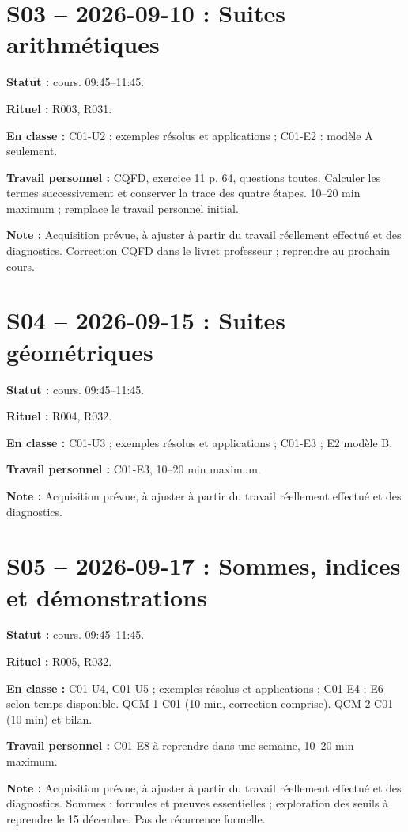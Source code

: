 \section*{S03 -- 2026-09-10 : Suites arithmétiques}
\textbf{Statut :} cours. 09:45–11:45.\par\textbf{Rituel :} R003, R031.\par\textbf{En classe :} C01-U2 ; exemples résolus et applications ; C01-E2 : modèle A seulement. \par\textbf{Travail personnel :} CQFD, exercice 11 p. 64, questions toutes. Calculer les termes successivement et conserver la trace des quatre étapes. 10–20 min maximum ; remplace le travail personnel initial.\par\textbf{Note :} Acquisition prévue, à ajuster à partir du travail réellement effectué et des diagnostics. Correction CQFD dans le livret professeur ; reprendre au prochain cours.
\section*{S04 -- 2026-09-15 : Suites géométriques}
\textbf{Statut :} cours. 09:45–11:45.\par\textbf{Rituel :} R004, R032.\par\textbf{En classe :} C01-U3 ; exemples résolus et applications ; C01-E3 ; E2 modèle B. \par\textbf{Travail personnel :} C01-E3, 10–20 min maximum.\par\textbf{Note :} Acquisition prévue, à ajuster à partir du travail réellement effectué et des diagnostics.
\section*{S05 -- 2026-09-17 : Sommes, indices et démonstrations}
\textbf{Statut :} cours. 09:45–11:45.\par\textbf{Rituel :} R005, R032.\par\textbf{En classe :} C01-U4, C01-U5 ; exemples résolus et applications ; C01-E4 ; E6 selon temps disponible.  QCM 1 C01 (10 min, correction comprise). QCM 2 C01 (10 min) et bilan.\par\textbf{Travail personnel :} C01-E8 à reprendre dans une semaine, 10–20 min maximum.\par\textbf{Note :} Acquisition prévue, à ajuster à partir du travail réellement effectué et des diagnostics. Sommes : formules et preuves essentielles ; exploration des seuils à reprendre le 15 décembre. Pas de récurrence formelle.

